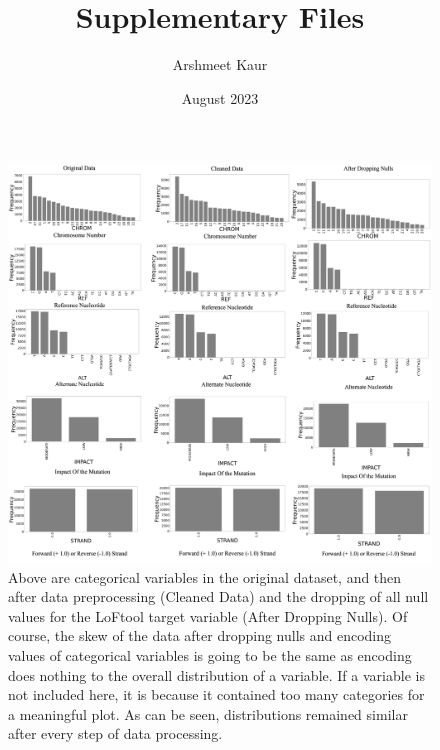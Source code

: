 \documentclass[journal,twoside,web]{ieeecolor}
\title{Supplementary Files}
\author{Arshmeet Kaur}
\date{August 2023}
\begin{document}
\clearpage
\begin{figure}[!t]
\centering
\includegraphics[width=\textwidth]{supplementary_kaur1.png}
\caption{Above are categorical variables in the original dataset, and then after data preprocessing (Cleaned Data) and the dropping of all null values for the LoFtool target variable (After Dropping Nulls). Of course, the skew of the data after dropping nulls and encoding values of categorical variables is going to be the same as encoding does nothing to the overall distribution of a variable. If a variable is not included here, it is because it contained too many categories for a meaningful plot. As can be seen, distributions remained similar after every step of data processing.}
\label{fig1}
\end{figure}
\end{document}
